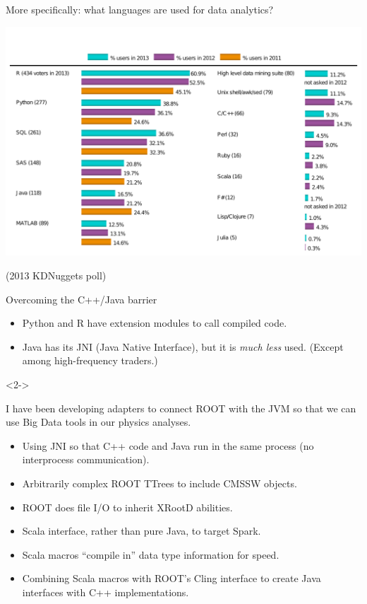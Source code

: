 \documentclass{beamer}
\begin{document}
\begin{frame}{}
\vfill
More specifically: what languages are used for data analytics?

\includegraphics[width=\linewidth]{KDNuggetsPoll.pdf}

\vfill
\scriptsize (2013 KDNuggets poll)
\end{frame}

\begin{frame}{Overcoming the C++/Java barrier}

\begin{itemize}
\item Python and R have extension modules to call compiled code.
\item Java has its JNI (Java Native Interface), but it is {\it much less} used. (Except among high-frequency traders.)
\end{itemize}

\begin{uncoverenv}<2->
\begin{block}{}
\vspace{-\baselineskip}
I have been developing adapters to connect ROOT with the JVM so that we can use Big Data tools in our physics analyses.

\begin{itemize}
\item Using JNI so that C++ code and Java run in the same process (no interprocess communication).
\item Arbitrarily complex ROOT TTrees to include CMSSW objects.
\item ROOT does file I/O to inherit XRootD abilities.
\item Scala interface, rather than pure Java, to target Spark.
\item Scala macros ``compile in'' data type information for speed.
\item Combining Scala macros with ROOT's Cling interface to create Java interfaces with C++ implementations.
\end{itemize}
\end{block}
\end{uncoverenv}
\end{frame}
\end{document}
